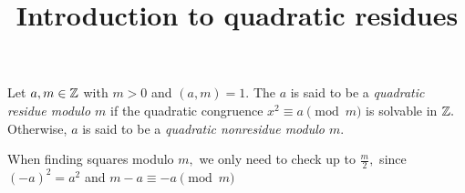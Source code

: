 \documentclass{ximera}
\title{Introduction to quadratic residues}
\begin{document}
\begin{abstract}
\end{abstract}
\maketitle




\begin{definition}\label{defn:quad-residue}
    Let $a,m\in\mathbb Z$ with $m>0$ and $(a,m)=1.$ The $a$ is said to be a \emph{quadratic residue modulo $m$} if the quadratic congruence $x^2\equiv a\pmod{m}$ is solvable in $\mathbb Z.$ Otherwise, $a$ is said to be a \emph{quadratic nonresidue modulo $m$}.
\end{definition}

\begin{remark}
    When finding squares modulo $m,$ we only need to check up to $\frac{m}{2},$ since $(-a)^2=a^2$ and $m-a\equiv -a\pmod{m}$
\end{remark}

\end{document}
